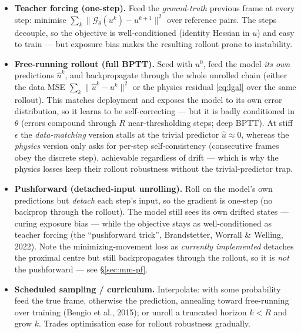 \documentclass[11pt]{article}
\newcommand{\uhat}{\hat u}
\begin{document}
\begin{itemize}\itemsep3pt
  \item \textbf{Teacher forcing (one-step).} Feed the \emph{ground-truth} previous frame at every
        step: minimise $\sum_k\|\mathcal G_\theta(u^{k})-u^{k+1}\|^2$ over reference pairs. The
        steps decouple, so the objective is well-conditioned (identity Hessian in $u$) and easy to
        train --- but exposure bias makes the resulting rollout prone to instability.
  \item \textbf{Free-running rollout (full BPTT).} Seed with $u^0$, feed the model \emph{its own}
        predictions $\uhat^{k}$, and backpropagate through the whole unrolled chain (either the data
        MSE $\sum_k\|\uhat^{k}-u^{k}\|^2$ or the physics residual \eqref{eq:lgal} over the same
        rollout). This matches deployment and exposes the model to its own error distribution, so it
        learns to be self-correcting --- but it is badly conditioned in $\theta$ (errors compound
        through $R$ near-thresholding steps; deep BPTT). At stiff $\epsilon$ the \emph{data-matching}
        version stalls at the trivial predictor $\uhat\approx 0$, whereas the \emph{physics} version
        only asks for per-step self-consistency (consecutive frames obey the discrete step),
        achievable regardless of drift --- which is why the physics losses keep their rollout
        robustness without the trivial-predictor trap.
  \item \textbf{Pushforward (detached-input unrolling).} Roll on the model's own predictions but
        \emph{detach} each step's input, so the gradient is one-step (no backprop through the
        rollout). The model still sees its own drifted states --- curing exposure bias --- while the
        objective stays as well-conditioned as teacher forcing (the ``pushforward trick'',
        Brandstetter, Worrall \& Welling, 2022). Note the minimizing-movement loss as \emph{currently
        implemented} detaches the proximal centre but still backpropagates through the rollout, so it
        is \emph{not} the pushforward --- see \S\ref{sec:mm-pf}.
  \item \textbf{Scheduled sampling / curriculum.} Interpolate: with some probability feed the true
        frame, otherwise the prediction, annealing toward free-running over training (Bengio et
        al., 2015); or unroll a truncated horizon $k<R$ and grow $k$. Trades optimisation ease for
        rollout robustness gradually.
\end{itemize}
\end{document}
